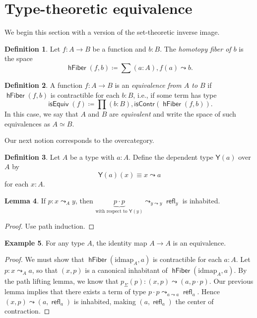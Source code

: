 \documentclass[10pt,letterpaper,cm]{nupset}
\theoremstyle{definition}
\newtheorem{definition}{Definition}[subsection]
\newtheorem{exmp}[definition]{Example}
\theoremstyle{theorem}
\newtheorem{lemma}[definition]{Lemma}
\theoremstyle{remark}
\newcommand{\1}{\mathbf{1}}
\newcommand{\0}{\vec 0}
\DeclareMathOperator{\refl}{\mathsf{refl}}
\DeclareMathOperator{\hfiber}{\mathsf{hFiber}}
\DeclareMathOperator{\isequiv}{\mathsf{isEquiv}}
\begin{document}
\section{Type-theoretic equivalence}

We begin this section with a version of the set-theoretic inverse image.

\begin{definition}
Let $f: A \to B$ be a function and $b: B$. The \textit{homotopy fiber of $b$} is the space $$\hfiber(f,b) \coloneqq \sum(a:A), f(a) \leadsto b .$$
\end{definition}

\begin{definition}
A function $f: A \to B$ is an \textit{equivalence from $A$ to $B$} if $\hfiber(f,b)$ is contractible for each $b: B$, i.e., if some term has type $$\isequiv(f) \coloneqq \prod(b: B),\mathsf{isContr}(\hfiber(f,b)).$$ In this case, we say that $A$ and $B$ are \textit{equivalent} and write the space of such equivalences as $A \simeq B$.
\end{definition}

Our next notion corresponds to the overcategory.

\begin{definition}
Let $A$ be a type with $a:A$. Define the dependent type $\mathsf{Y}(a)$ over $A$ by $$ \mathsf{Y}(a) (x) \equiv x \leadsto a $$ for each $x: A$. 
\end{definition}

\begin{lemma}
If $p: x \leadsto_A y$, then $\underbrace{p \cdot p}_{\text{with respect to } \mathsf{Y}(y)} \leadsto_{y \leadsto y} \refl_y$ is inhabited.
\end{lemma}
\begin{proof}
Use path induction.
\end{proof}

\begin{exmp}
For any type $A$, the identity map $A \to A$ is an equivalence.
\end{exmp}
\begin{proof}
We must show that $\hfiber(\text{idmap}_A, a)$ is contractible for each $a: A$. Let $p: x \leadsto_A a$, so that $(x,p)$ is a canonical inhabitant of  $\hfiber(\text{idmap}_A, a)$. By the path lifting lemma, we know that $p_{\Sigma}(p) : (x,p)  \leadsto (a, p \cdot p)$. Our previous lemma implies that there exists a term of type $p \cdot p \leadsto_{a\leadsto a} \refl_a$. Hence $(x, p)\leadsto (a, \refl_a)$ is inhabited, making $(a, \refl_a)$ the center of contraction.
\end{proof}
\end{document}
